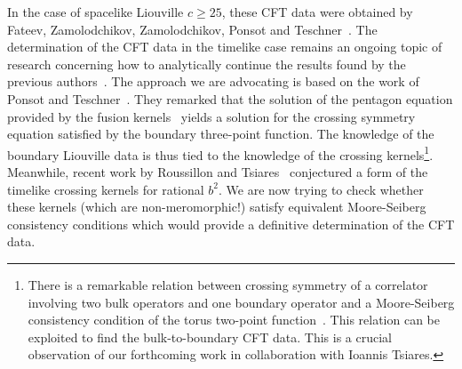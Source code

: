 \documentclass[a4paper]{article}
\begin{document}
In the case of spacelike Liouville $c\geq25$, these CFT data were obtained by Fateev, Zamolodchikov, Zamolodchikov, Ponsot and Teschner~\cite{fateev2000boundaryliouvillefieldtheory,zamolodchikov2001liouvillefieldtheorypseudosphere,Ponsot_2002}. The determination of the CFT data in the timelike case remains an ongoing topic of research concerning how to analytically continue the results found by the previous authors~\cite{giribet2026disk1pointfunctiontimelike,PhysRevD.106.126011}. The approach we are advocating is based on the work of Ponsot and Teschner~\cite{Ponsot_2002}. They remarked that the solution of the pentagon equation provided by the fusion kernels~\cite{eberhardt2023notescrossingtransformationsvirasoro,ribault2022conformalfieldtheoryplane,Moore:1989vd} yields a solution for the crossing symmetry equation satisfied by the boundary three-point function. The knowledge of the boundary Liouville data is thus tied to the knowledge of the crossing kernels\footnote{There is a remarkable relation between crossing symmetry of a correlator involving two bulk operators and one boundary operator and a Moore-Seiberg consistency condition of the torus two-point function~\cite{eberhardt2023notescrossingtransformationsvirasoro}. This relation can be exploited to find the bulk-to-boundary CFT data. This is a crucial observation of our forthcoming work in collaboration with Ioannis Tsiares.}. Meanwhile, recent work by Roussillon and Tsiares~\cite{Roussillon:2025tmv} conjectured a form of the timelike crossing kernels for rational $b^2 $. We are now trying to check whether these kernels (which are non-meromorphic!) satisfy equivalent Moore-Seiberg consistency conditions which would provide a definitive determination of the CFT data.
\end{document}
